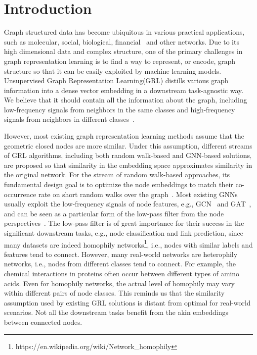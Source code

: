 \documentclass[10pt,journal,compsoc]{IEEEtran}
\begin{document}
\maketitle


\section{Introduction}
Graph structured data has become ubiquitous in various practical applications, such as molecular, social, biological, financial~\cite{Zhang18survey} and other networks.  Due to its high dimensional data and complex structure, one of the primary challenges in graph representation learning is to find a way to represent, or encode, graph structure so that it can be easily exploited by machine learning models\cite{Hamilton17_review}. Unsupervised Graph Representation Learning(GRL) distills various graph information into a dense vector embedding in a downstream task-agnostic way. We believe that it should contain all the information about the graph, including low-frequency signals from neighbors in the same classes and high-frequency signals from neighbors in different classes~\cite{bo21}. 



However, most existing graph representation learning methods assume that the geometric closed nodes are more similar. Under this assumption, different streams of GRL algorithms, including both random walk-based and GNN-based solutions, are proposed so that similarity in the embedding space approximates similarity in the original network\cite{Grover16, hou2019representation}. For the stream of random walk-based approaches, its fundamental design goal is to optimize the node embeddings to match their co-occurrence rate on short random walks over the graph~\cite{Hamilton17_review}. Most existing GNNs usually exploit the low-frequency signals of node features, e.g., GCN~\cite{Kipf16} and GAT~\cite{Veli17_GAT}, and can be seen as a particular form of the low-pass filter from the node perspectives~\cite{Nt19,xu-heat}. The low-pass filter is of great importance for their success in the significant downstream tasks\cite{wu2019simplifying}, e.g., node classification and link prediction, since many datasets are indeed homophily networks\footnote{https://en.wikipedia.org/wiki/Network\_homophily}, i.e., nodes with similar labels and features tend to connect. However, many real-world networks are heterophily networks, i.e., nodes from different classes tend to connect. For example, the chemical interactions in proteins often occur between different types of amino acids\cite{bo21}. Even for homophily networks, the actual level of homophily may vary within different pairs of node classes\cite{Zhu2020}. This reminds us that the similarity assumption used by existing GRL solutions is distant from optimal for real-world scenarios. Not all the downstream tasks benefit from the akin embeddings between connected nodes.
\end{document}
